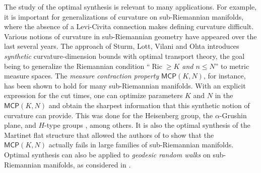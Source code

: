 \documentclass[12pt]{amsart}
\numberwithin{equation}{section}
\theoremstyle{plain}
\theoremstyle{definition}
\theoremstyle{remark}
\begin{document}
The study of the optimal synthesis is relevant to many applications. For example, it is important for generalizations of curvature on sub-Riemannian manifolds, where the absence of a Levi-Civita connection makes defining curvature difficult. Various notions of curvature in sub-Riemannian geometry have appeared over the last several years. The approach of Sturm, Lott, Vilani and Ohta introduces \emph{synthetic} curvature-dimension bounds with  optimal transport theory, the goal being to generalize the Riemannian condition ``\textit{$\operatorname{Ric} \geqslant K$ and $n \leqslant N$}'' to metric measure spaces. The \emph{measure contraction property} $\mathsf{MCP}(K, N)$, for instance, has been shown to hold for many sub-Riemannian manifolds. With an explicit expression for the cut times, one can optimize parameters $K$ and $N$ in the $\mathsf{MCP}(K, N)$ and obtain the sharpest information that this synthetic notion of curvature can provide. This was done for the Heisenberg group, the $\alpha$-Grushin plane, and $H$-type groups \cite{Juillet2009,BarilariRizzi2018,Borza2022,Rizzi2016}, among others. It is also the optimal synthesis of the Martinet flat structure \cite{AgrachevBonnardChybaKupka1997} that allowed the authors of \cite{borzaMCPfailure} to show that the $\mathsf{MCP}(K, N)$ actually fails in large families of sub-Riemannian manifolds.
Optimal synthesis can also be applied to \emph{geodesic random walks} on sub-Riemannian manifolds, as considered in \cite{GordinaLaetsch2017, AgrachevBoscainNeelRizzi2018, BoscainNeelRizzi2017, GordinaMelcherMikulincerWang2024}.
\end{document}
